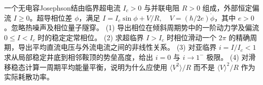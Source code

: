 一个无电容Josephson结由临界超电流 \(I_c>0\) 与并联电阻 \(R>0\) 组成，外部恒定偏流 \(I\ge0\)。超导相位差 \(\phi\)，满足
\(I=I_c\sin\phi+V/R,\quad V=(\hbar/2e)\dot\phi\)，其中 \(e>0\)。忽略热噪声及相位量子隧穿。
(1) 导出相位在倾斜周期势中的一阶动力学及偏流 \(0\le I<I_c\) 时的稳定定常相位。
(2) 求超临界 \(I>I_c\) 时相位滑动一个 \(2\pi\) 的精确周期，导出平均直流电压与外流电流之间的非线性关系。
(3) 对亚临界 \(i=I/I_c<1\) 求从局部稳定井底到相邻鞍顶的势垒高度，给出 \(i=0\) 与 \(i\to1^-\) 极限。
(4) 对滑移稳态计算一周期平均能量平衡，说明为什么应使用 \(\langle V^2\rangle/R\) 而不是 \(\langle V\rangle^2/R\) 作为实际耗散功率。
